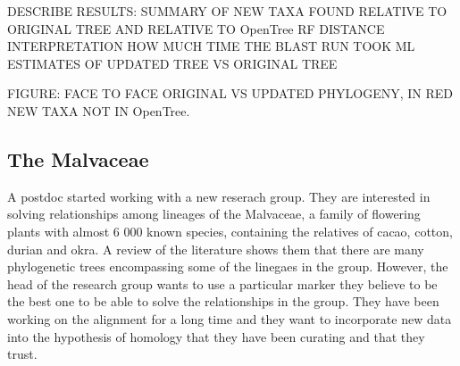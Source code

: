\documentclass[]{article}
\begin{document}
DESCRIBE RESULTS: SUMMARY OF NEW TAXA FOUND RELATIVE TO ORIGINAL TREE AND RELATIVE TO OpenTree
RF DISTANCE INTERPRETATION
HOW MUCH TIME THE BLAST RUN TOOK
ML ESTIMATES OF UPDATED TREE VS ORIGINAL TREE

FIGURE: FACE TO FACE ORIGINAL VS UPDATED PHYLOGENY, IN RED NEW TAXA NOT IN OpenTree.

\hypertarget{the-malvaceae}{%
\subsection{The Malvaceae}\label{the-malvaceae}}

A postdoc started working with a new reserach group. They are interested in solving relationships among lineages of the Malvaceae, a family of flowering plants with almost 6 000 known species, containing the relatives of cacao, cotton, durian and okra.
A review of the literature shows them that there are many phylogenetic trees encompassing some of the linegaes in the group. However, the head of the research group wants to use a particular marker they believe to be the best one to be able to solve the relationships in the group. They have been working on the alignment for a long time and they want to incorporate new data into the hypothesis of homology that they have been curating and that they trust.
\end{document}
